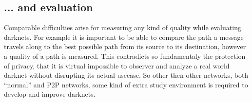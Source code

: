 \subsection{... and evaluation}

Comparable difficulties arise for measuring any kind of quality while evaluating darknets. For example it is important to be able to compare the path a message travels along to the best possible path from its source to its destination, however a quality of a path is measured. This contradicts so fundamentaly the protection of privacy, that it is virtual impossible to observer and analyze a real world darknet without disrupting its actual usecase. So other then other networks, both ``normal'' and P2P networks, some kind of extra study environment is required to develop and improve darknets.

